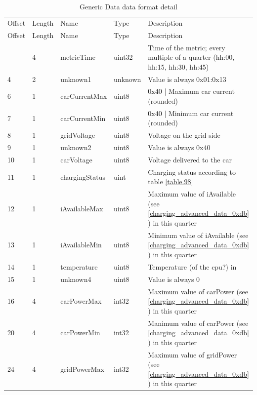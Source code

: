 \documentclass[a4paper]{article}
\newcommand{\secref}[1]{\ref{#1} \nameref{#1}}
\begin{document}
\hfill\break

\begin{longtable}[]{llllp{9cm}}
	\caption{Generic Data data format detail}
	\label{table.76o}\\  %
	\tabularnewline
	\toprule\noalign{}
	Offset & Length & Name    & Type    & Description \\
	\midrule\noalign{}
	\endfirsthead
	\toprule\noalign{}
	Offset & Length & Name    & Type    & Description \\
	\midrule\noalign{}
	\endhead
	\bottomrule\noalign{}
	\endlastfoot
	0      & 4      & metricTime & uint32     & Time of the metric; every multiple of a quarter (hh:00, hh:15, hh:30, hh:45)     \\
	4     & 2     & unknown1 & unknown &  Value is always 0x01:0x13   \\
	6     & 1     & carCurrentMax & uint8 &  0x40 | Maximum car current (rounded)  \\
	7     & 1     & carCurrentMin & uint8 &  0x40 | Minimum car current (rounded)  \\
	8     & 1     & gridVoltage & uint8 &    Voltage on the grid side         \\
	9     & 1     & unknown2 & uint8 &     Value is always 0x40     \\
	10     & 1     & carVoltage & uint8 &    Voltage delivered to the car \\
	11     & 1     & chargingStatus & uint &  Charging status according to table \ref{table.98}  \\
	12     & 1     & iAvailableMax & uint8 &     Maximum value of iAvailable (see \secref{charging_advanced_data_0xdb}) in this quarter        \\
	13     & 1     & iAvailableMin & uint8 &     Minimum value of iAvailable (see \secref{charging_advanced_data_0xdb}) in this quarter        \\
	14     & 1     & temperature & uint8 &     Temperature (of the cpu?)  in \textcelsius      \\
	15     & 1     & unknown4 & uint8 &   Value is always 0     \\
	16     & 4     & carPowerMax & int32 &  Maximum value of carPower  (see \secref{charging_advanced_data_0xdb}) in this quarter \\
	20     & 4     & carPowerMin & int32 &  Manimum value of carPower  (see \secref{charging_advanced_data_0xdb}) in this quarter   \\
	24     & 4     & gridPowerMax & int32 &  Maximum value of gridPower  (see \secref{charging_advanced_data_0xdb}) in this quarter \\

\end{longtable}
\end{document}
